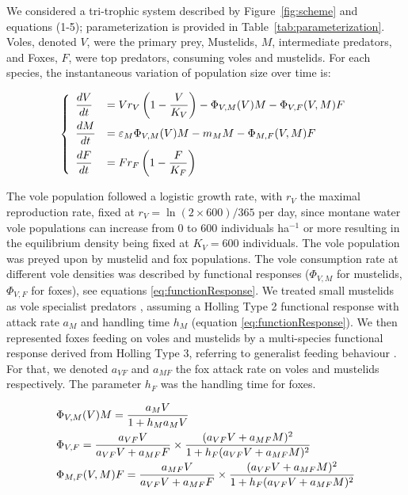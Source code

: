 \documentclass[11pt]{article}
\begin{document}
We considered a tri-trophic system described by Figure~\ref{fig:scheme} and equations (1-5); parameterization is provided in Table~\ref{tab:parameterization}. Voles, denoted $V$, were the primary prey, Mustelids, $M$, intermediate predators, and Foxes, $F$, were top predators, consuming voles and mustelids. For each species, the instantaneous variation of population size over time is:

\begin{equation}
\left\{
\begin{array}{l l}
\dfrac{dV}{dt} & = V r_V \left( 1- \dfrac{V}{K_V}\right) - \Phi_{V,M}(V)M - \Phi_{V,F}(V,M)F\\[.3cm]
%
\dfrac{dM}{dt} & = \varepsilon_M \Phi_{V,M}(V)M - m_M M - \Phi_{M,F}(V,M)F\\[.3cm]
%
\dfrac{dF}{dt} & = F r_F \left( 1- \dfrac{F}{K_F}\right)
\end{array}
\right.
\end{equation}

The vole population followed a logistic growth rate, with $r_V$  the maximal reproduction rate, fixed at $r_V = \ln(2 \times 600)/365$ per day, since montane water vole populations can increase from 0  to  600 individuals ha$^{-1}$ or more \citep{Giraudoux1997} resulting in the equilibrium density being fixed at $K_V = 600$ individuals. 
%
The vole population was preyed upon by mustelid and fox populations. The vole consumption rate at different vole densities was described by functional responses ($\Phi_{V,M}$ for mustelids, $\Phi_{V,F}$  for foxes), see equations \eqref{eq:functionResponse}.
%
We treated small mustelids as vole specialist predators \citep{King2006}, assuming a Holling Type 2 functional response with attack rate $a_M$ and handling time $h_M$ (equation \eqref{eq:functionResponse}). We then represented foxes feeding on voles and mustelids by a multi-species functional response derived from Holling Type 3, referring to generalist feeding behaviour \citep{Baudrot2016}. For that, we denoted $a_{VF}$ and $a_{MF}$ the fox attack rate on voles and mustelids respectively. The parameter $h_F$ was the handling time for foxes.


\begin{equation}
\begin{array}{l l}
 \Phi_{V,M}(V)M = \dfrac{a_M V}{1 + h_M a_M V} \\[.3cm]
 \Phi_{V,F} = \dfrac{a_{VF} V}{a_{VF}V + a_{MF}F} \times \dfrac{(a_{VF}V + a_{MF} M)^2}{1 + h_F(a_{VF}V + a_{MF} M)^2}\\[.3cm]
  \Phi_{M,F}(V,M)F = \dfrac{a_{MF}V}{a_{VF}V + a_{MF}F} \times \dfrac{(a_{VF}V + a_{MF}M)^2}{1+h_F(a_{VF}V + a_{MF}M)^2}
\end{array}
\label{eq:functionResponse}
\end{equation}
\end{document}
